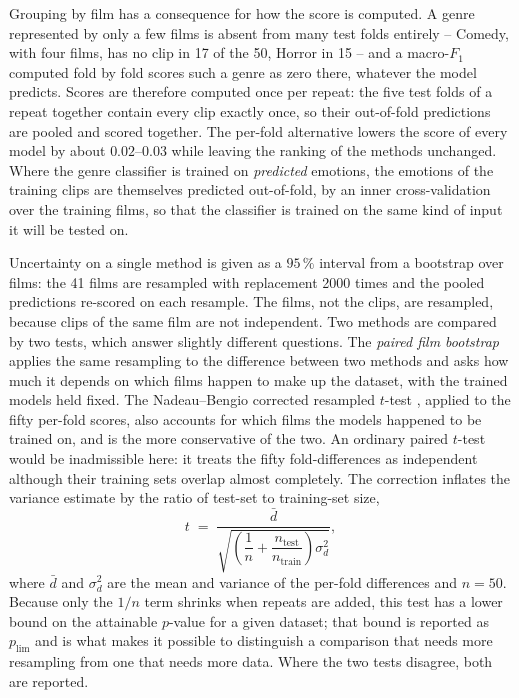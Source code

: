 Grouping by film has a consequence for how the score is computed. A genre represented by
only a few films is absent from many test folds entirely -- Comedy, with four films, has
no clip in 17 of the 50, Horror in 15 -- and a macro-$F_1$ computed fold by fold scores
such a genre as zero there, whatever the model predicts. Scores are therefore computed
once per repeat: the five test folds of a repeat together contain every clip exactly
once, so their out-of-fold predictions are pooled and scored together. The per-fold
alternative lowers the score of every model by about $0.02$--$0.03$ while leaving the
ranking of the methods unchanged. Where the genre classifier is trained on \emph{predicted} emotions, the
emotions of the training clips are themselves predicted out-of-fold, by an inner
cross-validation over the training films, so that the classifier is trained on the same
kind of input it will be tested on.

Uncertainty on a single method is given as a $95\,\%$ interval from a bootstrap over
films: the 41 films are resampled with replacement 2000 times and the pooled predictions
re-scored on each resample. The films, not the clips, are resampled, because clips of the
same film are not independent. Two methods are compared by two tests, which answer
slightly different questions. The \emph{paired film bootstrap} applies the same resampling
to the difference between two methods and asks how much it depends on which films happen
to make up the dataset, with the trained models held fixed. The Nadeau--Bengio corrected
resampled $t$-test \citep{nadeau2003inference}, applied to the fifty per-fold scores, also
accounts for which films the models happened to be trained on, and is the more conservative
of the two. An ordinary paired $t$-test would be inadmissible here: it treats the fifty
fold-differences as independent although their training sets overlap almost completely.
The correction inflates the variance estimate by the ratio of test-set to training-set
size,
\[
  t \;=\; \frac{\bar{d}}{\sqrt{\left(\dfrac{1}{n}+\dfrac{n_{\text{test}}}{n_{\text{train}}}\right)\sigma^2_{d}}},
\]
where $\bar{d}$ and $\sigma^2_d$ are the mean and variance of the per-fold differences
and $n=50$. Because only the $1/n$ term shrinks when repeats are added, this test has a
lower bound on the attainable $p$-value for a given dataset; that bound is reported as
$p_{\lim}$ and is what makes it possible to distinguish a comparison that needs more
resampling from one that needs more data. Where the two tests disagree, both are reported.

